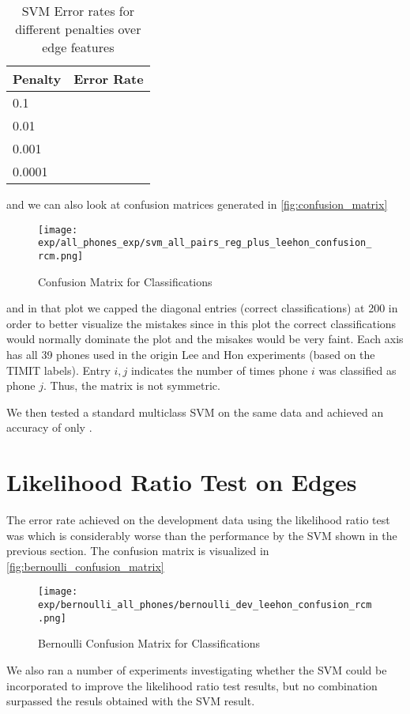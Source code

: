 \documentclass{article}
\begin{document}
\begin{table}[h]
  \centering
  \begin{tabular}{| l |  r |}
    \hline
     Penalty & Error Rate \\ \hline\hline
     0.1 &  \\
     \hline
     0.01 &  \\
     \hline
     0.001 &  \\
     \hline
     0.0001 &   \\
     \hline
  \end{tabular}
  \caption{SVM Error rates for different penalties over edge features}
  \label{tab:myfirsttable}
\end{table}
and we can also look at confusion matrices generated in \autoref{fig:confusion_matrix}
\begin{figure}[h]
\centering
\texttt{[image: exp/all\_phones\_exp/svm\_all\_pairs\_reg\_plus\_leehon\_confusion\_rcm.png]}
\caption{Confusion Matrix for Classifications}
\label{fig:confusion_matrix}
\end{figure}
and in that plot we capped the diagonal entries (correct classifications) at 200
in order to better visualize the mistakes since in this plot the
correct classifications would normally dominate the plot and the misakes would be very faint.  Each axis has all 39 phones used in the origin Lee and Hon experiments (based on the TIMIT labels).  Entry $i,j$ indicates the number of times phone $i$ was classified as phone $j$.  Thus, the matrix is not symmetric.

We then tested a standard multiclass SVM on the same data and
achieved an accuracy of only .

\section{Likelihood Ratio Test on Edges}

The error rate achieved on the development data using the likelihood
ratio test was  which is considerably worse than the performance by
the SVM shown in the previous section.  The confusion matrix is
visualized in \autoref{fig:bernoulli_confusion_matrix}
\begin{figure}[h]
\centering
\texttt{[image: exp/bernoulli\_all\_phones/bernoulli\_dev\_leehon\_confusion\_rcm.png]}
\caption{Bernoulli Confusion Matrix for Classifications}
\label{fig:bernoulli_confusion_matrix}
\end{figure}


We also ran a number of experiments investigating whether the SVM could be incorporated to improve the likelihood ratio test results, 
but no combination surpassed the resuls obtained with the
SVM result.
\end{document}

